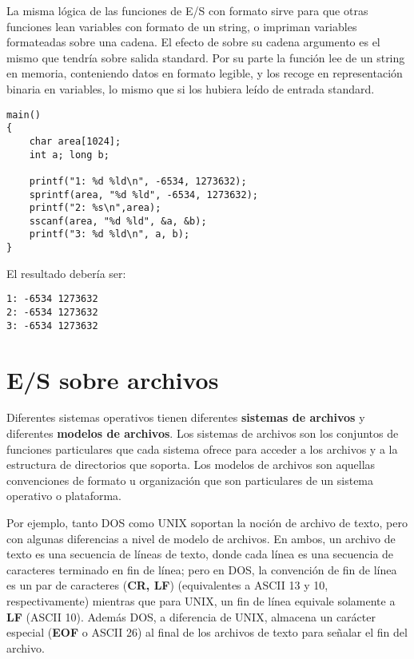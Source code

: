 La misma lógica de las funciones de E/S con formato sirve para que otras
funciones lean variables con formato de un string, o impriman variables
formateadas sobre una cadena. El efecto de  sobre su cadena argumento
es el mismo que tendría  sobre salida standard. Por su parte la función 
 lee de un string en memoria, conteniendo datos en formato legible, y los
recoge en representación binaria en variables, lo mismo que si  los
hubiera leído de entrada standard.

\begin{ejemplo}
\begin{lstlisting}
main()
{
    char area[1024];
    int a; long b;
    
	printf("1: %d %ld\n", -6534, 1273632);
    sprintf(area, "%d %ld", -6534, 1273632);
	printf("2: %s\n",area);
    sscanf(area, "%d %ld", &a, &b);
    printf("3: %d %ld\n", a, b);
}
\end{lstlisting}

El resultado debería ser:
\begin{lstlisting}
1: -6534 1273632
2: -6534 1273632
3: -6534 1273632
\end{lstlisting}
\end{ejemplo}

\chapter{E/S sobre archivos}
\label{sec:esarchivos}

Diferentes sistemas operativos tienen diferentes \textbf{sistemas de archivos} y
diferentes \textbf{modelos de archivos}. Los sistemas de archivos son los conjuntos de
funciones particulares que cada sistema ofrece para acceder a los archivos y a
la estructura de directorios que soporta. Los modelos de archivos son aquellas
convenciones de formato u organización que son particulares de un sistema
operativo o plataforma.

Por ejemplo, tanto DOS como UNIX soportan la noción de archivo de texto, pero
con algunas diferencias a nivel de modelo de archivos. En ambos, un archivo de
texto es una secuencia de líneas de texto, donde cada línea es una secuencia de
caracteres terminado en fin de línea; pero en DOS, la convención de fin de
línea es un par de caracteres (\textbf{CR, LF}) (equivalentes a ASCII 13 y 10, respectivamente) mientras
que para UNIX, un fin de línea equivale solamente a \textbf{LF} (ASCII 10). Además DOS, a diferencia de UNIX,
almacena un carácter especial (\textbf{EOF} o ASCII 26) al final de los archivos 
de texto para señalar el fin del archivo.


